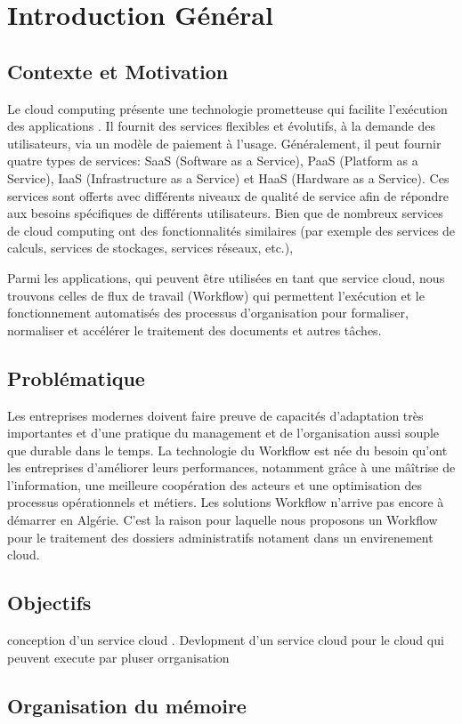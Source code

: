 \chapter*{Introduction Général }


\section*{Contexte et Motivation} 
Le cloud computing  présente une technologie prometteuse qui facilite l'exécution des applications . Il fournit des services flexibles et évolutifs, à la demande des utilisateurs, via un modèle de paiement à l'usage. Généralement, il peut fournir quatre types de services: SaaS (Software as a Service), PaaS (Platform as a Service), IaaS (Infrastructure as a Service) et HaaS (Hardware as a Service). Ces services sont offerts avec différents niveaux de qualité de service afin de répondre aux besoins spécifiques de différents utilisateurs. Bien que de nombreux services de cloud computing  ont des fonctionnalités similaires (par exemple des services de calculs, services de stockages, services  réseaux, etc.),

Parmi les  applications, qui peuvent être  utilisées en tant que service cloud, nous trouvons celles de flux de travail (Workflow)  qui permettent l'exécution et le fonctionnement automatisés des processus d'organisation pour formaliser, normaliser et accélérer le traitement des documents et autres tâches.




\section*{Problématique}

Les entreprises modernes doivent faire preuve de capacités d'adaptation très importantes et d'une pratique du management et de l'organisation aussi souple que durable dans le temps.  La technologie du Workflow est née du besoin qu'ont les entreprises d'améliorer leurs performances, notamment grâce à une mâîtrise de l'information, une meilleure coopération des acteurs et une optimisation des processus opérationnels et métiers. Les solutions Workflow n’arrive pas encore à démarrer en Algérie. C’est la raison pour laquelle nous  proposons un Workflow pour le traitement des dossiers administratifs notament dans un envirenement cloud.


 
\section*{Objectifs}


conception d'un service cloud .
Devlopment d'un service cloud pour le cloud qui peuvent execute par pluser orrganisation 

\section*{Organisation du mémoire}